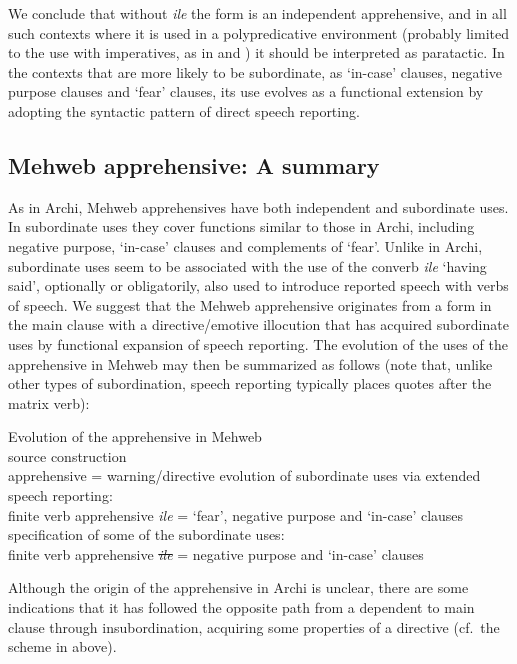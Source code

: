 \documentclass[output=paper,colorlinks,citecolor=brown]{langscibook}
\begin{document}
We conclude that without \textit{ile} the form is an independent apprehensive, and in all such contexts where it is used in a polypredicative environment (probably limited to the use with imperatives, as in  and ) it should be interpreted as paratactic. In the contexts that are more likely to be subordinate, as `in-case' clauses, negative purpose clauses and `fear' clauses, its use evolves as a functional extension by adopting the syntactic pattern of direct speech reporting. 



\subsection{Mehweb apprehensive: A summary}
\label{subsec:Mapprehensive}
 
As in Archi, Mehweb apprehensives have both independent and subordinate uses. In subordinate uses they cover functions similar to those in Archi, including negative purpose, `in-case' clauses and complements of `fear'. Unlike in Archi, subordinate uses seem to be associated with the use of the converb \textit{ile} `having said', optionally or obligatorily, also used to introduce reported speech with verbs of speech. We suggest that the Mehweb apprehensive originates from a form in the main clause with a directive/emotive illocution that has acquired subordinate uses by functional expansion of speech reporting. The evolution of the uses of the apprehensive in Mehweb may then be summarized as follows (note that, unlike other types of subordination, speech reporting typically places quotes after the matrix verb):


\ea \label{ex:DD59} \textnormal{Evolution of the apprehensive in Mehweb} \\
\ea \label{ex:DD59a}\textnormal{source construction} \\
\textnormal{{\ob}apprehensive{\cb} = warning/directive}
\ex \textnormal{evolution of subordinate uses via extended speech reporting:} \\
\textnormal{{\ob}finite verb {\ob}apprehensive{\cb} \textit{ile}{\cb}  = `fear', negative purpose and `in-case' clauses}
\ex \textnormal{specification of some of the subordinate uses:} \\
\textnormal{{\ob}finite verb {\ob}apprehensive{\cb} \sout{\textit{ile}}{\cb}  = negative purpose and `in-case' clauses}
\z
\z

Although the origin of the apprehensive in Archi is unclear, there are some indications that it has followed the opposite path from a dependent to main clause through insubordination, acquiring some properties of a directive (cf.\ the scheme in  above).
\end{document}

